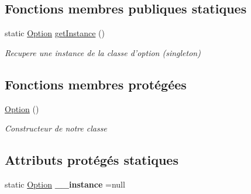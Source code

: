 \subsection*{Fonctions membres publiques statiques}
\begin{DoxyCompactItemize}
\item 
static \hyperlink{class_w_p_f_page_switch_1_1_option}{Option} \hyperlink{class_w_p_f_page_switch_1_1_option_ac468a2f3469807420d2aba6ac0d38954}{get\+Instance} ()
\begin{DoxyCompactList}\small\item\em Recupere une instance de la classe d'option (singleton) \end{DoxyCompactList}\end{DoxyCompactItemize}
\subsection*{Fonctions membres protégées}
\begin{DoxyCompactItemize}
\item 
\hyperlink{class_w_p_f_page_switch_1_1_option_abdc1ef228eec651bd7b1d080dc6aaf7e}{Option} ()
\begin{DoxyCompactList}\small\item\em Constructeur de notre classe \end{DoxyCompactList}\end{DoxyCompactItemize}
\subsection*{Attributs protégés statiques}
\begin{DoxyCompactItemize}
\item 
\hypertarget{class_w_p_f_page_switch_1_1_option_a064585b78e376e3d5ceb46216641f8c4}{static \hyperlink{class_w_p_f_page_switch_1_1_option}{Option} {\bfseries \+\_\+\+\_\+instance} =null}\label{class_w_p_f_page_switch_1_1_option_a064585b78e376e3d5ceb46216641f8c4}

\end{DoxyCompactItemize}
